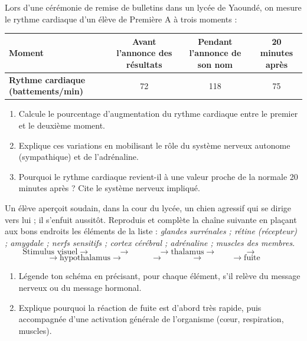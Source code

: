 \documentclass[11pt]{article}
\newcommand{\cle}[1]{{\popxbold\color{popdark}#1}}
\newcounter{popsec}
\newcounter{popsub}
\newcommand{\courssub}[1]{%
  \stepcounter{popsub}%
  \par\vspace{9pt}\noindent{\popxbold\fontsize{11.5}{13}\selectfont\color{popink}{\color{poporange}\thepopsec.\thepopsub}\hspace{6pt}#1}\par\nopagebreak\vspace{4pt}
}
\begin{document}
\courssub{Je m'entraîne}

\begin{exercice}
Lors d'une cérémonie de remise de bulletins dans un lycée de Yaoundé, on mesure le rythme cardiaque d'un élève de Première A à trois moments :
\begin{center}
\begin{tabular}{|l|c|c|c|}
\hline
\rowcolor{popblueL} \textbf{Moment} & Avant l'annonce des résultats & Pendant l'annonce de son nom & 20 minutes après \\
\hline
\textbf{Rythme cardiaque (battements/min)} & 72 & 118 & 75 \\
\hline
\end{tabular}
\end{center}
\begin{enumerate}
\item Calcule le pourcentage d'augmentation du rythme cardiaque entre le premier et le deuxième moment.
\item Explique ces variations en mobilisant le rôle du \cle{système nerveux autonome} (sympathique) et de l'\cle{adrénaline}.
\item Pourquoi le rythme cardiaque revient-il à une valeur proche de la normale 20 minutes après ? Cite le système nerveux impliqué.
\end{enumerate}
\end{exercice}

\begin{exercice}
Un élève aperçoit soudain, dans la cour du lycée, un chien agressif qui se dirige vers lui ; il s'enfuit aussitôt. Reproduis et complète la chaîne suivante en plaçant aux bons endroits les éléments de la liste : \emph{glandes surrénales ; rétine (récepteur) ; amygdale ; nerfs sensitifs ; cortex cérébral ; adrénaline ; muscles des membres}.
\[ \text{Stimulus visuel} \longrightarrow \boxed{\phantom{XXXX}} \longrightarrow \boxed{\phantom{XXXX}} \longrightarrow \text{thalamus} \longrightarrow \boxed{\phantom{XXXX}} \longrightarrow \boxed{\phantom{XXXX}} \]
\[ \longrightarrow \text{hypothalamus} \longrightarrow \boxed{\phantom{XXXX}} \longrightarrow \boxed{\phantom{XXXX}} \longrightarrow \boxed{\phantom{XXXX}} \longrightarrow \text{fuite} \]
\begin{enumerate}
\item Légende ton schéma en précisant, pour chaque élément, s'il relève du message nerveux ou du message hormonal.
\item Explique pourquoi la réaction de fuite est d'abord très rapide, puis accompagnée d'une activation générale de l'organisme (cœur, respiration, muscles).
\end{enumerate}
\end{exercice}
\end{document}
